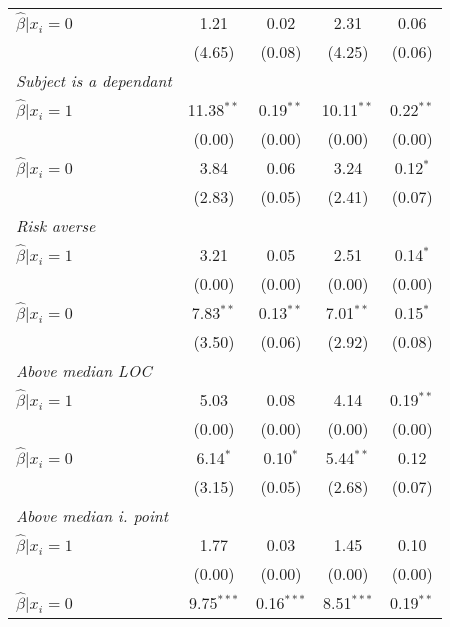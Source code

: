 \begin{table}[htbp]
{\begin{threeparttable}
\begin{tabular}{l*{4}{c}}
\hspace{0.5cm} \(\hat\beta|x_i=0\)&     1.21&     0.02&     2.31&     0.06\\
                &   (4.65)&   (0.08)&   (4.25)&   (0.06)\\
\textit{Subject is a dependant}&         &         &         &         \\
\hspace{0.5cm} \(\hat\beta|x_i=1\)&11.38$^{**}$&0.19$^{**}$&10.11$^{**}$&0.22$^{**}$\\
                &   (0.00)&   (0.00)&   (0.00)&   (0.00)\\
\hspace{0.5cm} \(\hat\beta|x_i=0\)&     3.84&     0.06&     3.24&0.12$^{*}$\\
                &   (2.83)&   (0.05)&   (2.41)&   (0.07)\\
\textit{Risk averse}&         &         &         &         \\
\hspace{0.5cm} \(\hat\beta|x_i=1\)&     3.21&     0.05&     2.51&0.14$^{*}$\\
                &   (0.00)&   (0.00)&   (0.00)&   (0.00)\\
\hspace{0.5cm} \(\hat\beta|x_i=0\)&7.83$^{**}$&0.13$^{**}$&7.01$^{**}$&0.15$^{*}$\\
                &   (3.50)&   (0.06)&   (2.92)&   (0.08)\\
\textit{Above median LOC}&         &         &         &         \\
\hspace{0.5cm} \(\hat\beta|x_i=1\)&     5.03&     0.08&     4.14&0.19$^{**}$\\
                &   (0.00)&   (0.00)&   (0.00)&   (0.00)\\
\hspace{0.5cm} \(\hat\beta|x_i=0\)&6.14$^{*}$&0.10$^{*}$&5.44$^{**}$&     0.12\\
                &   (3.15)&   (0.05)&   (2.68)&   (0.07)\\
\textit{Above median i. point}&         &         &         &         \\
\hspace{0.5cm} \(\hat\beta|x_i=1\)&     1.77&     0.03&     1.45&     0.10\\
                &   (0.00)&   (0.00)&   (0.00)&   (0.00)\\
\hspace{0.5cm} \(\hat\beta|x_i=0\)&9.75$^{***}$&0.16$^{***}$&8.51$^{***}$&0.19$^{**}$\\

\end{tabular}
\end{threeparttable}}
\end{table}
